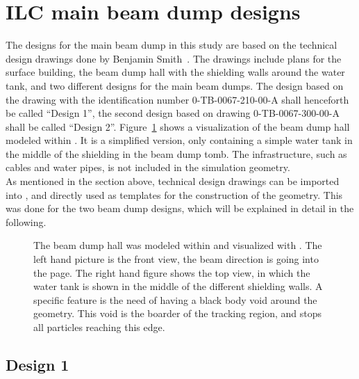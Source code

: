 \section{ILC main beam dump designs}
\label{BeamDumps:designs}
The designs for the main beam dump in this study are based on the technical design drawings done by Benjamin Smith~\cite{Smith_drawings}.
The drawings include plans for the surface building, the beam dump hall with the shielding walls around the water tank, and two different designs for the main beam dumps.
The design based on the drawing with the identification number 0-TB-0067-210-00-A shall henceforth be called ``Design 1'', the second design based on drawing 0-TB-0067-300-00-A shall be called ``Design 2''.
Figure~\ref{fig:BeamDumps:geometry} shows a visualization of the beam dump hall modeled within \fluka. 
It is a simplified version, only containing a simple water tank in the middle of the shielding in the beam dump tomb. 
The infrastructure, such as cables and water pipes, is not included in the simulation geometry.
\\As mentioned in the section above, technical design drawings can be imported into \flair, and directly used as templates for the construction of the geometry.
This was done for the two beam dump designs, which will be explained in detail in the following.
\begin{figure}[hbp]
\begin{center}
\caption[Geometry visualization of the ILC main beam dump hall]{The beam dump hall was modeled within \fluka and visualized with \flair.
The left hand picture is the front view, the beam direction is going into the page.
The right hand figure shows the top view, in which the water tank is shown in the middle of the different shielding walls. 
A \fluka specific feature is the need of having a black body void around the geometry. 
This void is the boarder of the tracking region, and stops all particles reaching this edge.}
\label{fig:BeamDumps:geometry}
\end{center}
\end{figure}

\subsection{Design 1}
\label{BeamDumps:design:design1}

